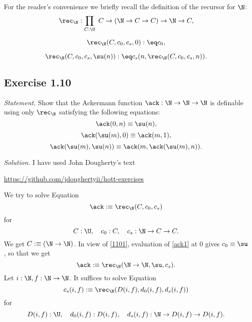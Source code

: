 \documentclass[12pt]{article}
\begin{document}
For the reader's convenience we briefly recall the definition of the recursor for $\N$:
$$
\rec_\N:\prod_{C:\U}\ C\to(\N\to C\to C)\to\N\to C,
$$

$$\rec_\N(C,c_0,c_s,0):\eq c_0,$$

$$\rec_\N(C,c_0,c_s,\su(n)):\eq c_s(n,\rec_\N(C,c_0,c_s,n)).$$


\subsection{Exercise 1.10}

\emph{Statement.} Show that the Ackermann function $\ack:\N\to\N\to\N$ is definable using only $\rec_\N$ satisfying the following equations:
\begin{equation}\label{1101}
\ack(0,n)\equiv\su(n),
\end{equation}
\begin{equation}\label{1102}
\ack(\su(m),0)\equiv\ack(m,1),
\end{equation}
\begin{equation}\label{1103}
\ack(\su(m),\su(n))\equiv\ack(m,\ack(\su(m),n)).
\end{equation}

\nn\emph{Solution.} I have used John Dougherty's text 

\nn\href{https://github.com/jdoughertyii/hott-exercises}{https://github.com/jdoughertyii/hott-exercises}

We try to solve Equation 
\begin{equation}\label{ack1}
\ack:\equiv\rec_\N(C,c_0,c_s)
\end{equation}
for 
$$
C:\U,\quad c_0:C,\quad c_s:\N\to C\to C.
$$ 
We get $C:\equiv(\N\to\N)$. In view of \eqref{1101}, evaluation of \eqref{ack1} at 0 gives $c_0\equiv\su$, so that we get 
\begin{equation}\label{ack1b}
\ack:\equiv\rec_\N(\N\to\N,\su,c_s).
\end{equation}
Let $i:\N,f:\N\to\N$. It suffices to solve Equation 
\begin{equation}\label{ack2}
c_s(i,f):\equiv\rec_\N(D(i,f),d_0(i,f),d_s(i,f))
\end{equation}
for 
$$
D(i,f):\U,\quad d_0(i,f):D(i,f),\quad d_s(i,f):\N\to D(i,f)\to D(i,f).
$$ 
\end{document}

